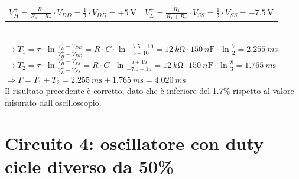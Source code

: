\documentclass{report}
\begin{document}
\begin{table}[h!]
	\begin{tabular}{cc}
		\;\;\;$\displaystyle{V_H^+=\frac{R_1}{R_1+R_2}\cdot V_{DD}=\frac{1}{2}\cdot V_{DD}=+\SI{5}{\volt}}$\;\;\;\;\;\;\;\;\;\;\;\;\;\;\;\;\;\;\;\;\;\;\; & $\displaystyle{V_L^+=\frac{R_1}{R_1+R_2}\cdot V_{SS}=\frac{1}{2}\cdot V_{SS}=-\SI{7.5}{\volt}}$\\ 
	\end{tabular}
\end{table}
\\\indent$\rightarrow\displaystyle{T_1=\tau\cdot\ln\frac{V_L^+-V_{DD}}{V_H^+-V_{DD}}=R\cdot C\cdot\ln\frac{-7.5-10}{5-10}=\SI{12}{k\ohm}\cdot\SI{150}{n\farad}\cdot\ln\frac{7}{2}}=\SI{2.255}{m\second}$
\\[6pt]\indent$\rightarrow\displaystyle{T_2=\tau\cdot\ln\frac{V_H^+-V_{SS}}{V_L^+-V_{SS}}=R\cdot C\cdot\ln\frac{5+15}{-7.5+15}=\SI{12}{k\ohm}\cdot\SI{150}{n\farad}\cdot\ln\frac{8}{3}}=\SI{1.765}{m\second}$
\\[6pt]\indent$\Rightarrow\displaystyle{T=T_1+T_2=\SI{2.255}{m\second}+\SI{1.765}{m\second}=\SI{4.020}{m\second}}$
\\[2pt]Il risultato precedente è corretto, dato che è inferiore del 1.7\% rispetto al valore misurato dall'oscilloscopio.
\newpage
\section{Circuito 4: oscillatore con duty cicle diverso da 50\%}
\end{document}
